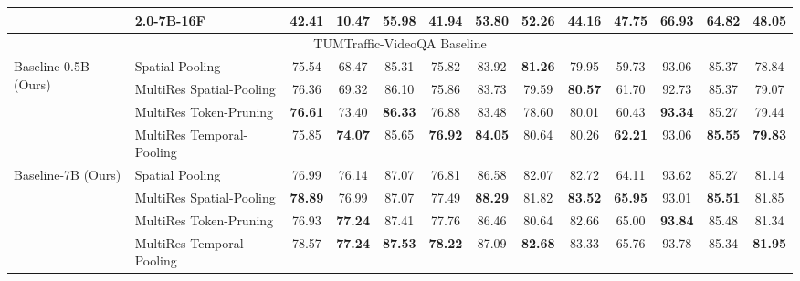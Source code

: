 \begin{table*}[t!]
{\begin{tabular}{l | l | cc | cc | cc | cc| cc | c}
& 2.0-7B-16F & 42.41 & 10.47 & 55.98 & 41.94 & 53.80 & 52.26 & 44.16 & 47.75 & 66.93 & 64.82 & 48.05 \\
\midrule

\multicolumn{13}{c}{TUMTraffic-VideoQA Baseline} \\ 
\midrule
\multirow{4}{*}{Baseline-0.5B (Ours)} & Spatial Pooling  & 75.54 & 68.47 & 85.31 & 75.82 & 83.92 & \textbf{81.26} & 79.95 & 59.73 & 93.06 & 85.37 & 78.84 \\

 & MultiRes Spatial-Pooling & 76.36 & 69.32 & 86.10 & 75.86 & 83.73 & 79.59 & \textbf{80.57} & 61.70 & 92.73 & 85.37 & 79.07 \\
 
& MultiRes Token-Pruning  &  \textbf{76.61} & 73.40 & \textbf{86.33} & 76.88 & 83.48 & 78.60 & 80.01 & 60.43 & \textbf{93.34} & 85.27 & 79.44 \\

\rowcolor{gray!10}
& MultiRes Temporal-Pooling & 75.85 & \textbf{74.07} & 85.65 & \textbf{76.92} & \textbf{84.05} & 80.64 & 80.26 & \textbf{62.21} & 93.06 & \textbf{85.55} & \textbf{79.83} \\
\midrule

\multirow{4}{*}{Baseline-7B (Ours)} & Spatial Pooling & 76.99 & 76.14 & 87.07 & 76.81 & 86.58 & 82.07 & 82.72 & 64.11 & 93.62 & 85.27 & 81.14 \\

& MultiRes Spatial-Pooling  & \textbf{78.89} & 76.99 & 87.07 & 77.49 & \textbf{88.29} & 81.82 & \textbf{83.52} & \textbf{65.95} & 93.01 & \textbf{85.51} & 81.85 \\

& MultiRes Token-Pruning & 76.93 & \textbf{77.24} & 87.41 & 77.76 & 86.46 & 80.64 & 82.66 & 65.00 & \textbf{93.84} & 85.48 & 81.34 \\

\rowcolor{gray!10}
& MultiRes Temporal-Pooling & 78.57 & \textbf{77.24} & \textbf{87.53} & \textbf{78.22} & 87.09 & \textbf{82.68} & 83.33 & 65.76 & 93.78 & 85.34 & \textbf{81.95} \\
\midrule
\end{tabular}%
}

\label{table:consolidated_metrics}
\vspace{-2pt}

\end{table*}